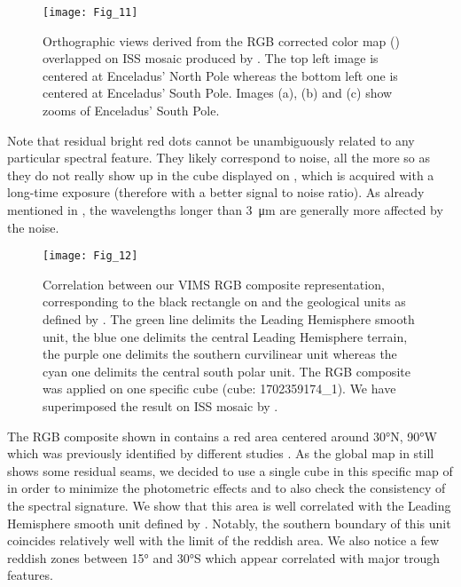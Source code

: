 \documentclass{arxiv-icarus}
\begin{document}
\begin{figure*}[!ht]
    \texttt{[image: Fig\_11]}
    \caption{Orthographic views derived from the RGB corrected color map () overlapped on ISS mosaic produced by \cite{Bland2018}. The top left image is centered at Enceladus' North Pole whereas the bottom left one is centered at Enceladus' South Pole. Images (a), (b) and (c) show zooms of Enceladus' South Pole.}
    \label{fig:fig_11}
\end{figure*}


Note that residual bright red dots cannot be unambiguously related to any particular spectral feature. They likely correspond to noise, all the more so as they do not really show up in the cube displayed on , which is acquired with a long-time exposure (therefore with a better signal to noise ratio). As already mentioned in , the wavelengths longer than \SI{3}{\um} are generally more affected by the noise.


\begin{figure}[!ht]
    \texttt{[image: Fig\_12]}
    \caption{Correlation between our VIMS RGB composite representation, corresponding to the black rectangle on  and the geological units as defined by \cite{Crow-Willard2015}. The green line delimits the Leading Hemisphere smooth unit, the blue one delimits the central Leading Hemisphere terrain, the purple one delimits the southern curvilinear unit whereas the cyan one delimits the central south polar unit. The RGB composite was applied on one specific cube (cube: 1702359174\_1). We have superimposed the result on ISS mosaic by \cite{Bland2018}.}
    \label{fig:fig_12}
\end{figure}


The RGB composite shown in  contains a red area centered around \ang{30}N, \ang{90}W which was previously identified by different studies \citep{Ries2015, Scipioni2017, Combe2019}. As the global map in  still shows some residual seams, we decided to use a single cube in this specific map of  in order to minimize the photometric effects and to also check the consistency of the spectral signature. We show that this area is well correlated with the Leading Hemisphere smooth unit defined by \cite{Crow-Willard2015}. Notably, the southern boundary of this unit coincides relatively well with the limit of the reddish area. We also notice a few reddish zones between \ang{15} and \ang{30}S which appear correlated with major trough features.
\end{document}
